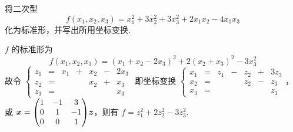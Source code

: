 \begin{example}
    将二次型 $$f(x_1,x_2,x_3)=x_1^2+3x_2^2+3x_3^2+2x_1x_2-4x_1x_3$$ 化为标准形，并写出所用坐标变换.
\end{example}
\begin{solution}
    $f$ 的标准形为 $$f(x_1,x_2,x_3)=(x_1+x_2-2x_3)^2+2(x_2+x_3)^2-3x_3^2$$
    故令 $\left\{\begin{matrix}
            z_1 & = & x_1 & + & x_2 & - & 2x_3 \\
            z_2 & = &     &   & x_2 & + & x_3  \\
            z_3 & = &     &   &     &   & x_3
        \end{matrix}\right.$ 即坐标变换 $\left\{\begin{matrix}
            x_1 & = & z_1 & - & z_2 & + & 3z_3 \\
            x_2 & = &     &   & z_2 & - & z_3  \\
            x_3 & = &     &   &     &   & z_3
        \end{matrix}\right.$，或 $\vb*{x}=\mqty(1&-1&3\\0&1&-1\\0&0&1)\vb*{z}$，则有 $f=z_1^2+2z_2^2-3z_3^2.$
\end{solution}

